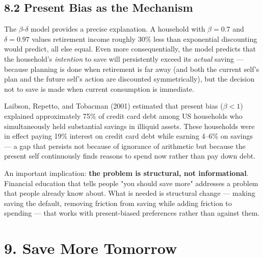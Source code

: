 \documentclass[12pt, letterpaper]{article}
\begin{document}
\subsection{8.2 Present Bias as the Mechanism}


The $\beta$-$\delta$ model provides a precise explanation. A household with $\beta = 0.7$ and $\delta = 0.97$ values retirement income roughly 30\% less than exponential discounting would predict, all else equal. Even more consequentially, the model predicts that the household's \textit{intention} to save will persistently exceed its \textit{actual} saving --- because planning is done when retirement is far away (and both the current self's plan and the future self's action are discounted symmetrically), but the decision not to save is made when current consumption is immediate.

Laibson, Repetto, and Tobacman (2001) estimated that present bias ($\beta < 1$) explained approximately 75\% of credit card debt among US households who simultaneously held substantial savings in illiquid assets. These households were in effect paying 19\% interest on credit card debt while earning 4--6\% on savings --- a gap that persists not because of ignorance of arithmetic but because the present self continuously finds reasons to spend now rather than pay down debt.

An important implication: \textbf{the problem is structural, not informational}. Financial education that tells people "you should save more" addresses a problem that people already know about. What is needed is structural change --- making saving the default, removing friction from saving while adding friction to spending --- that works with present-biased preferences rather than against them.

\medskip


\section{9. Save More Tomorrow}
\end{document}
